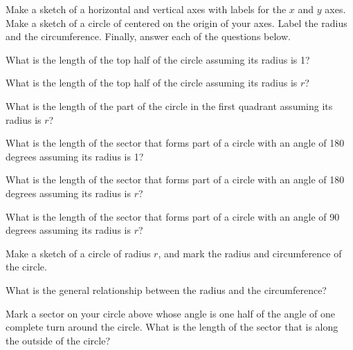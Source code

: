 \begin{problem}
\item Make a sketch of a horizontal and vertical axes with labels for
  the $x$ and $y$ axes. Make a sketch of a circle of centered on the
  origin of your axes. Label the radius and the
  circumference. Finally, answer each of the questions below.

  \vfill

  \begin{subproblem}
    \item What is the length of the top half of the circle assuming
      its radius is 1?
      \vspace{3em}
    \item What is the length of the top half of the circle assuming
      its radius is $r$?
      \vspace{3em}
    \item What is the length of the part of the circle in the first
      quadrant assuming its radius is $r$?  
      \vspace{3em}

    \item What is the length of the sector that forms part of a circle
      with an angle of 180 degrees assuming its radius is 1?  
      \vspace{3em}
    \item What is the length of the sector that forms part of a circle
      with an angle of 180 degrees assuming its radius is $r$?  
      \vspace{3em}
    \item What is the length of the sector that forms part of a circle
      with an angle of 90 degrees assuming its radius is $r$?  
      \vspace{3em}

  \end{subproblem}

  \clearpage

\item Make a sketch of a circle of radius $r$, and mark the radius and
  circumference of the circle.
  \vfill

  \begin{subproblem}
  \item What is the general relationship between the radius and the
    circumference? 
    \vspace{4em}

  \item Mark a sector on your circle above whose angle is one half of
    the angle of one complete turn around the circle. What is the
    length of the sector that is along the outside of the circle?



\end{subproblem}
\end{problem}

